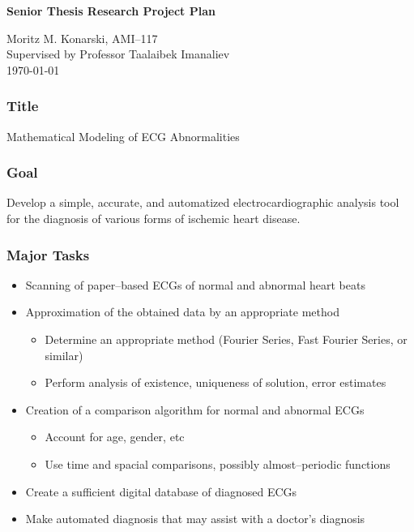 \documentclass[a4paper, 12pt, reqno]{article}
\newcommand{\titl}{Senior Thesis Research Project Plan}
\newcommand{\auth}{Moritz M. Konarski, AMI--117}
\begin{document}
\begin{center}
    \begin{large}
        \textbf{\titl{}}\\
    \end{large}
        \vspace{4pt}
        \auth{}\\
        \vspace{3pt}
        Supervised by Professor Taalaibek Imanaliev\\
        \vspace{3pt}
        \today{}
\end{center}

\subsubsection*{Title}

Mathematical Modeling of ECG Abnormalities

\subsubsection*{Goal}

Develop a simple, accurate, and automatized electrocardiographic analysis tool 
for the diagnosis of various forms of ischemic heart disease.

\subsubsection*{Major Tasks}
\begin{itemize}
    \item Scanning of paper--based ECGs of normal and abnormal heart beats
    \item Approximation of the obtained data by an appropriate method
        \begin{itemize}
            \item Determine an appropriate method (Fourier Series, Fast
                Fourier Series, or similar)
            \item Perform analysis of existence, uniqueness of solution, error
                estimates
        \end{itemize}
    \item Creation of a comparison algorithm for normal and abnormal ECGs
        \begin{itemize}
            \item Account for age, gender, etc
            \item Use time and spacial comparisons, possibly almost--periodic
                functions
        \end{itemize}
    \item Create a sufficient digital database of diagnosed ECGs
    \item Make automated diagnosis that may assist with a doctor's diagnosis
\end{itemize}
\end{document}

